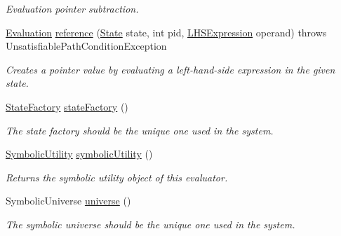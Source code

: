 \begin{DoxyCompactItemize}
\begin{DoxyCompactList}\small\item\em Evaluation pointer subtraction. \end{DoxyCompactList}\item 
\hyperlink{classedu_1_1udel_1_1cis_1_1vsl_1_1civl_1_1semantics_1_1IF_1_1Evaluation}{Evaluation} \hyperlink{classedu_1_1udel_1_1cis_1_1vsl_1_1civl_1_1semantics_1_1common_1_1CommonEvaluator_a7c3c429a7eb6fc522d4fc8484f69d48a}{reference} (\hyperlink{interfaceedu_1_1udel_1_1cis_1_1vsl_1_1civl_1_1state_1_1IF_1_1State}{State} state, int pid, \hyperlink{interfaceedu_1_1udel_1_1cis_1_1vsl_1_1civl_1_1model_1_1IF_1_1expression_1_1LHSExpression}{L\+H\+S\+Expression} operand)  throws Unsatisfiable\+Path\+Condition\+Exception 
\begin{DoxyCompactList}\small\item\em Creates a pointer value by evaluating a left-\/hand-\/side expression in the given state. \end{DoxyCompactList}\item 
\hyperlink{interfaceedu_1_1udel_1_1cis_1_1vsl_1_1civl_1_1state_1_1IF_1_1StateFactory}{State\+Factory} \hyperlink{classedu_1_1udel_1_1cis_1_1vsl_1_1civl_1_1semantics_1_1common_1_1CommonEvaluator_af829d561994b7fed63516b08a1eab74c}{state\+Factory} ()
\begin{DoxyCompactList}\small\item\em The state factory should be the unique one used in the system. \end{DoxyCompactList}\item 
\hyperlink{interfaceedu_1_1udel_1_1cis_1_1vsl_1_1civl_1_1dynamic_1_1IF_1_1SymbolicUtility}{Symbolic\+Utility} \hyperlink{classedu_1_1udel_1_1cis_1_1vsl_1_1civl_1_1semantics_1_1common_1_1CommonEvaluator_a1a026669aaadbbe84c7bb014c518dbc5}{symbolic\+Utility} ()
\begin{DoxyCompactList}\small\item\em Returns the symbolic utility object of this evaluator. \end{DoxyCompactList}\item 
Symbolic\+Universe \hyperlink{classedu_1_1udel_1_1cis_1_1vsl_1_1civl_1_1semantics_1_1common_1_1CommonEvaluator_a1928221045cc691e75ba9368b16ddb09}{universe} ()
\begin{DoxyCompactList}\small\item\em The symbolic universe should be the unique one used in the system. \end{DoxyCompactList}\item 

\end{DoxyCompactItemize}

